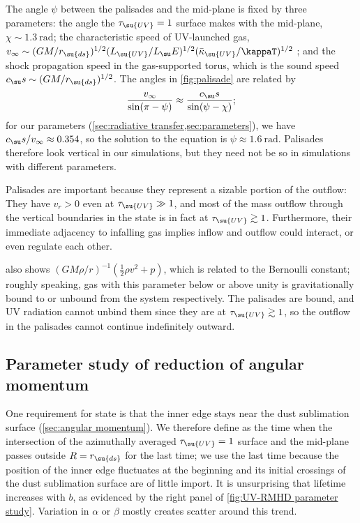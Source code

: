 \documentclass[twocolumn]{article}
\begin{document}
The angle $\psi$ between the palisades and the mid-plane is fixed by three
parameters: the angle the $\tau_\su{UV}=1$ surface makes with the mid-plane,
$\chi\sim\SI{1.3}{\radian}$; the characteristic speed of \ac{UV}-launched gas,
$v_\infty\sim(GM/r_\su{ds})^{1/2}(L_\su{UV}/L_\su
E)^{1/2}(\bar\kappa_\su{UV}/\kappaT)^{1/2}$ ;
and the shock propagation speed in the gas-supported torus, which is the sound
speed $c_\su s\sim(GM/r_\su{ds})^{1/2}$. The angles in \cref{fig:palisade} are
related by \begin{equation}\label{eq:wing angle}
\frac{v_\infty}{\sin(\pi-\psi)}\approx\frac{c_\su s}{\sin(\psi-\chi)};
\end{equation} for our parameters (\cref{sec:radiative
transfer,sec:parameters}), we have $c_\su s/v_\infty\approx0.354$, so the
solution to the equation is $\psi\approx\SI{1.6}{\radian}$. Palisades therefore
look vertical in our simulations, but they need not be so in simulations with
different parameters.

Palisades are important because they represent a sizable portion of the
outflow: They have $v_r>0$ even at $\tau_\su{UV}\gg1$, and most of the mass
outflow through the vertical boundaries in the  state is in
fact at $\tau_\su{UV}\gtrsim1$. Furthermore, their immediate adjacency to
infalling gas implies inflow and outflow could interact, or even regulate each
other.

 also shows $(GM\rho/r)^{-1}(\tfrac12\rho v^2+p)$, which is
related to the Bernoulli constant; roughly speaking, gas with this parameter
below or above unity is gravitationally bound to or unbound from the system
respectively. The palisades are bound, and \ac{UV} radiation cannot unbind them
since they are at $\tau_\su{UV}\gtrsim1$, so the outflow in the palisades
cannot continue indefinitely outward.

\subsection{Parameter study of reduction of angular momentum}
\label{sec:parameter study}

One requirement for  state is that the inner edge stays near
the dust sublimation surface (\cref{sec:angular momentum}). We therefore define
 as the time when the intersection of the azimuthally
averaged $\tau_\su{UV}=1$ surface and the mid-plane passes outside
$R=r_\su{ds}$ for the last time; we use the last time because the position of
the inner edge fluctuates at the beginning and its initial crossings of the
dust sublimation surface are of little import. It is unsurprising that lifetime
increases with $b$, as evidenced by the right panel of \cref{fig:UV-RMHD
parameter study}. Variation in $\alpha$ or $\beta$ mostly creates scatter
around this trend.
\end{document}
